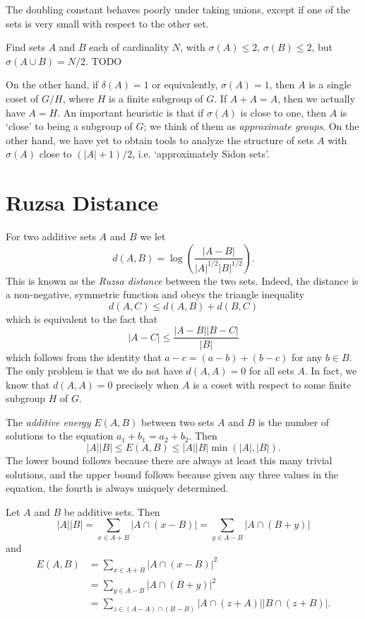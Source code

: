 The doubling constant behaves poorly under taking unions, except if one of the sets is very small with respect to the other set.

\begin{example}
    Find sets $A$ and $B$ each of cardinality $N$, with $\sigma(A) \leq 2$, $\sigma(B) \leq 2$, but $\sigma(A \cup B) = N/2$. TODO
\end{example}

On the other hand, if $\delta(A) = 1$ or equivalently, $\sigma(A) = 1$, then $A$ is a single coset of $G/H$, where $H$ is a finite subgroup of $G$. If $A + A = A$, then we actually have $A = H$. An important heuristic is that if $\sigma(A)$ is close to one, then $A$ is `close' to being a subgroup of $G$; we think of them as \emph{approximate groups}. On the other hand, we have yet to obtain tools to analyze the structure of sets $A$ with $\sigma(A)$ close to $(|A| + 1)/2$, i.e. `approximately Sidon sets'.

\section{Ruzsa Distance}

For two additive sets $A$ and $B$ we let
%
\[ d(A,B) = \log \left( \frac{|A-B|}{|A|^{1/2}|B|^{1/2}} \right). \]
%
This is known as the \emph{Ruzsa distance} between the two sets. Indeed, the distance is a non-negative, symmetric function and obeys the triangle inequality
%
\[ d(A,C) \leq d(A,B) + d(B,C) \]
%
which is equivalent to the fact that
%
\[ |A-C| \leq \frac{|A-B||B-C|}{|B|} \]
%
which follows from the identity that $a - c = (a - b) + (b - c)$ for any $b \in B$. The only problem is that we do not have $d(A,A) = 0$ for all sets $A$. In fact, we know that $d(A,A) = 0$ precisely when $A$ is a coset with respect to some finite subgroup $H$ of $G$.

The \emph{additive energy} $E(A,B)$ between two sets $A$ and $B$ is the number of solutions to the equation $a_1 + b_1 = a_2 + b_2$. Then
%
\[ |A||B| \leq E(A,B) \leq |A| |B| \min(|A|,|B|). \]
%
The lower bound follows because there are always at least this many trivial solutions, and the upper bound follows because given any three values in the equation, the fourth is always uniquely determined.

\begin{lemma}
    Let $A$ and $B$ be additive sets. Then
    \[ |A||B| = \sum_{x \in A + B} |A \cap (x - B)| = \sum_{y \in A - B} |A \cap (B + y)| \]
    and
    \begin{align*}
        E(A,B) &= \sum_{x \in A + B} |A \cap (x - B)|^2\\
        &= \sum_{y \in A-B} |A \cap (B + y)|^2\\
        &= \sum_{z \in (A - A) \cap (B - B)} |A \cap (z + A)||B \cap (z + B)|.
    \end{align*}
\end{lemma}

